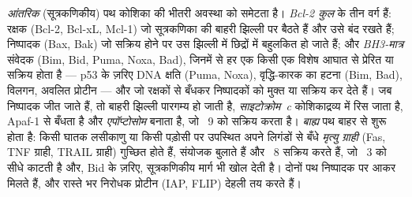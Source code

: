 \begin{definition}[दोनों पथ]\label{def:b3:cell-cycle-apoptosis:pathways}
\emph{आंतरिक} (सूत्रकणिकीय) पथ कोशिका की भीतरी अवस्था को समेटता है।
\emph{Bcl-2 कुल} के तीन वर्ग हैं: रक्षक
(Bcl-2, Bcl-xL, Mcl-1) जो सूत्रकणिका की बाहरी झिल्ली पर बैठते हैं और
उसे बंद रखते हैं; निष्पादक (Bax, Bak) जो सक्रिय होने पर उस झिल्ली में
छिद्रों में बहुलकित हो जाते हैं; और \emph{BH3-मात्र} संवेदक (Bim, Bid,
Puma, Noxa, Bad), जिनमें से हर एक किसी एक विशेष आघात से प्रेरित या
सक्रिय होता है --- p53 के ज़रिए DNA क्षति (Puma, Noxa), वृद्धि-कारक का
हटना (Bim,
Bad), विलगन, अवलित प्रोटीन --- और जो रक्षकों से बँधकर निष्पादकों को
मुक्त या सक्रिय कर देते हैं। जब निष्पादक जीत जाते हैं, तो बाहरी झिल्ली
पारगम्य हो जाती है, \emph{साइटोक्रोम~c} कोशिकाद्रव्य में रिस जाता है,
Apaf-1 से बँधता है और \emph{एपॉप्टोसोम} बनाता है, जो ~9 को
सक्रिय करता है। \emph{बाह्य} पथ बाहर से शुरू होता है: किसी घातक
लसीकाणु या किसी पड़ोसी पर उपस्थित अपने लिगंडों से बँधे
\emph{मृत्यु ग्राही} (Fas, TNF ग्राही, TRAIL ग्राही) गुच्छित होते हैं,
संयोजक बुलाते हैं और ~8 सक्रिय करते हैं, जो ~3 को सीधे
काटती है और, Bid के ज़रिए, सूत्रकणिकीय मार्ग भी खोल देती है। दोनों पथ
निष्पादक  पर आकर मिलते हैं, और रास्ते भर निरोधक प्रोटीन
(IAP, FLIP) देहली तय करते हैं।
\end{definition}

